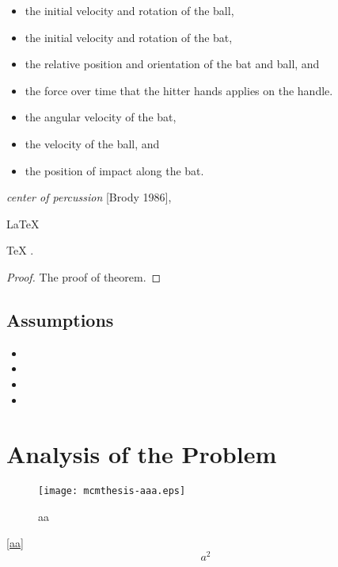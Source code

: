 \documentclass{mcmthesis}
\begin{document}
\begin{itemize}
\item the initial velocity and rotation of the ball,
\item the initial velocity and rotation of the bat,
\item the relative position and orientation of the bat and ball, and
\item the force over time that the hitter hands applies on the handle.
\end{itemize}
\lipsum[3]
\begin{itemize}
\item the angular velocity of the bat,
\item the velocity of the ball, and
\item the position of impact along the bat.
\end{itemize}
\lipsum[4]
\emph{center of percussion} [Brody 1986], \lipsum[5]

\begin{Theorem} \label{thm:latex}
\LaTeX {}
\end{Theorem}
\begin{Lemma} 
TeX .
\end{Lemma}
\begin{proof}
The proof of theorem.
\end{proof}

\subsection{Assumptions}
\lipsum[6]
\begin{itemize}
\item
\item
\item
\item
\end{itemize}

\lipsum[7]

\section{Analysis of the Problem}
\begin{figure}[h]%
\small%
\centering%
\texttt{[image: mcmthesis-aaa.eps]}
\caption{aa} \label{fig:aa}
\end{figure}

\lipsum[8] \eqref{aa}
\begin{equation}
a^2 \label{aa}
\end{equation}
\end{document}
